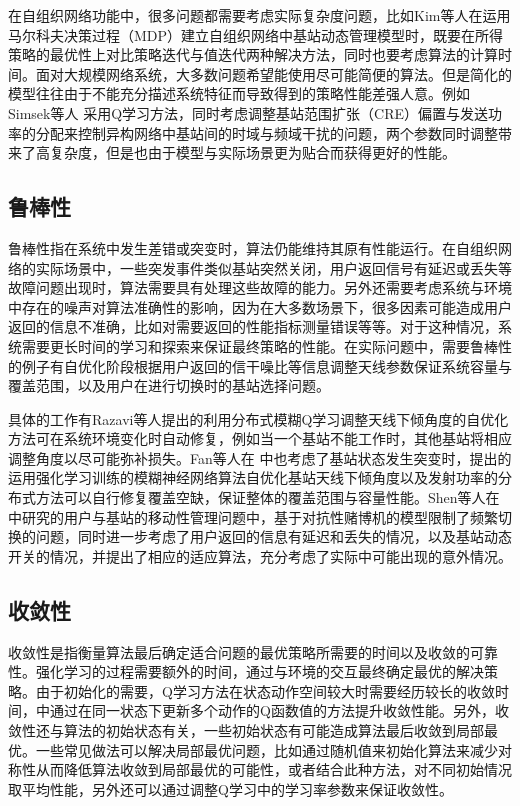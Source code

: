 ﻿\documentclass[11pt,draftclsnofoot,onecolumn,journal,letterpaper]{IEEEtran}
\begin{document}
在自组织网络功能中，很多问题都需要考虑实际复杂度问题，比如Kim等人\cite{Kim2014}在运用马尔科夫决策过程（MDP）建立自组织网络中基站动态管理模型时，既要在所得策略的最优性上对比策略迭代与值迭代两种解决方法，同时也要考虑算法的计算时间。面对大规模网络系统，大多数问题希望能使用尽可能简便的算法。但是简化的模型往往由于不能充分描述系统特征而导致得到的策略性能差强人意。例如Simsek等人\cite{Simsek2015} 采用Q学习方法，同时考虑调整基站范围扩张（CRE）偏置与发送功率的分配来控制异构网络中基站间的时域与频域干扰的问题，两个参数同时调整带来了高复杂度，但是也由于模型与实际场景更为贴合而获得更好的性能。

\subsection{鲁棒性}
鲁棒性指在系统中发生差错或突变时，算法仍能维持其原有性能运行。在自组织网络的实际场景中，一些突发事件类似基站突然关闭，用户返回信号有延迟或丢失等故障问题出现时，算法需要具有处理这些故障的能力。另外还需要考虑系统与环境中存在的噪声对算法准确性的影响，因为在大多数场景下，很多因素可能造成用户返回的信息不准确，比如对需要返回的性能指标测量错误等等。对于这种情况，系统需要更长时间的学习和探索来保证最终策略的性能。在实际问题中，需要鲁棒性的例子有自优化阶段根据用户返回的信干噪比等信息调整天线参数保证系统容量与覆盖范围，以及用户在进行切换时的基站选择问题。

具体的工作有Razavi等人\cite{Razavi2010}提出的利用分布式模糊Q学习调整天线下倾角度的自优化方法可在系统环境变化时自动修复，例如当一个基站不能工作时，其他基站将相应调整角度以尽可能弥补损失。Fan等人在\cite{Fan2014} 中也考虑了基站状态发生突变时，提出的运用强化学习训练的模糊神经网络算法自优化基站天线下倾角度以及发射功率的分布式方法可以自行修复覆盖空缺，保证整体的覆盖范围与容量性能。Shen等人在\cite{Shen2016} 中研究的用户与基站的移动性管理问题中，基于对抗性赌博机的模型限制了频繁切换的问题，同时进一步考虑了用户返回的信息有延迟和丢失的情况，以及基站动态开关的情况，并提出了相应的适应算法，充分考虑了实际中可能出现的意外情况。

\subsection{收敛性}
收敛性是指衡量算法最后确定适合问题的最优策略所需要的时间以及收敛的可靠性。强化学习的过程需要额外的时间，通过与环境的交互最终确定最优的解决策略。由于初始化的需要，Q学习方法在状态动作空间较大时需要经历较长的收敛时间，\cite{Simsek2011}中通过在同一状态下更新多个动作的Q函数值的方法提升收敛性能。另外，收敛性还与算法的初始状态有关，一些初始状态有可能造成算法最后收敛到局部最优。一些常见做法可以解决局部最优问题，比如通过随机值来初始化算法来减少对称性从而降低算法收敛到局部最优的可能性，或者结合此种方法，对不同初始情况取平均性能，另外还可以通过调整Q学习中的学习率参数来保证收敛性。
\end{document}
